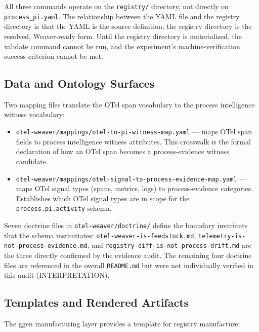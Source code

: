 All three commands operate on the \texttt{registry/} directory, not directly on
\texttt{process\_pi.yaml}. The relationship between the YAML file and the registry directory
is that the YAML is the source definition; the registry directory is the resolved, Weaver-ready
form. Until the registry directory is materialized, the validate command cannot be run, and the
experiment's machine-verification success criterion cannot be met.

\subsection{Data and Ontology Surfaces}
\label{sec:otel-weaver-exp-001-custom-pi-registry-implementation-data}

Two mapping files translate the OTel span vocabulary to the process intelligence witness vocabulary:

\begin{itemize}
  \item \texttt{otel-weaver/mappings/otel-to-pi-witness-map.yaml} --- maps OTel span fields to
        process intelligence witness attributes. This crosswalk is the formal declaration of how
        an OTel span becomes a process-evidence witness candidate.
  \item \texttt{otel-weaver/mappings/otel-signal-to-process-evidence-map.yaml} --- maps OTel
        signal types (spans, metrics, logs) to process-evidence categories. Establishes which
        OTel signal types are in scope for the \texttt{process.pi.activity} schema.
\end{itemize}

Seven doctrine files in \texttt{otel-weaver/doctrine/} define the boundary invariants that the
schema instantiates:
\texttt{otel-weaver-is-feedstock.md},
\texttt{telemetry-is-not-process-evidence.md}, and
\texttt{registry-diff-is-not-process-drift.md} are the three directly confirmed by the evidence
audit. The remaining four doctrine files are referenced in the overall \texttt{README.md} but
were not individually verified in this audit (INTERPRETATION).

\subsection{Templates and Rendered Artifacts}
\label{sec:otel-weaver-exp-001-custom-pi-registry-implementation-templates}

The ggen manufacturing layer provides a template for registry manufacture:

